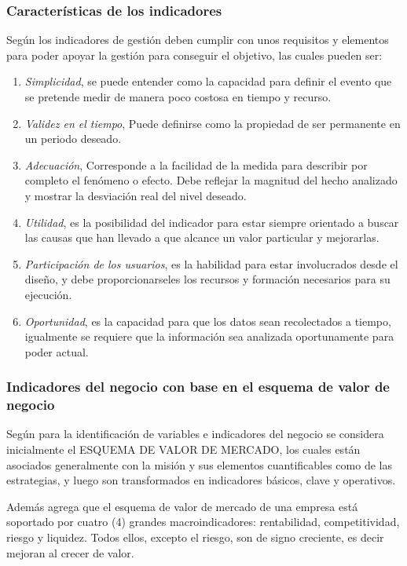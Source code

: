 \subsubsection{Características de los indicadores}
Según \cite{silva} los indicadores de gestión deben cumplir con unos requisitos
y elementos para poder apoyar la gestión para conseguir el objetivo, las cuales
pueden ser:
\begin{enumerate}
    \item \emph{Simplicidad}, se puede entender como la capacidad para definir el
          evento que se pretende medir de manera poco costosa en tiempo y recurso.
    \item \emph{Validez en el tiempo}, Puede definirse como la propiedad de ser
          permanente en un periodo deseado.
    \item \emph{Adecuación}, Corresponde a la facilidad de la medida para describir
          por completo el fenómeno o efecto. Debe reflejar la magnitud del hecho
          analizado y mostrar la desviación real del nivel deseado.
    \item \emph{Utilidad}, es la posibilidad del indicador para estar siempre
          orientado a buscar las causas que han llevado a que alcance un valor
          particular y mejorarlas.
    \item \emph{Participación de los usuarios}, es la habilidad para estar involucrados
          desde el diseño, y debe proporcionarseles los recursos y formación necesarios
          para su ejecución.
    \item \emph{Oportunidad}, es la capacidad para que los datos sean recolectados
          a tiempo, igualmente se requiere que la información sea analizada oportunamente
          para poder actual.
\end{enumerate}

\subsubsection{Indicadores del negocio con base en el esquema de valor de negocio}
Según \cite{cruz} para la identificación de variables e indicadores del negocio
se considera inicialmente el ESQUEMA DE VALOR DE MERCADO, los cuales están asociados
generalmente con la misión y sus elementos cuantificables como de las estrategias,
y luego son transformados en indicadores básicos, clave y operativos.

Además \cite{cruz} agrega que el esquema de valor de mercado de una empresa está
soportado por cuatro (4) grandes macroindicadores: rentabilidad, competitividad,
riesgo y liquidez. Todos ellos, excepto el riesgo, son de signo creciente, es
decir mejoran al crecer de valor.

